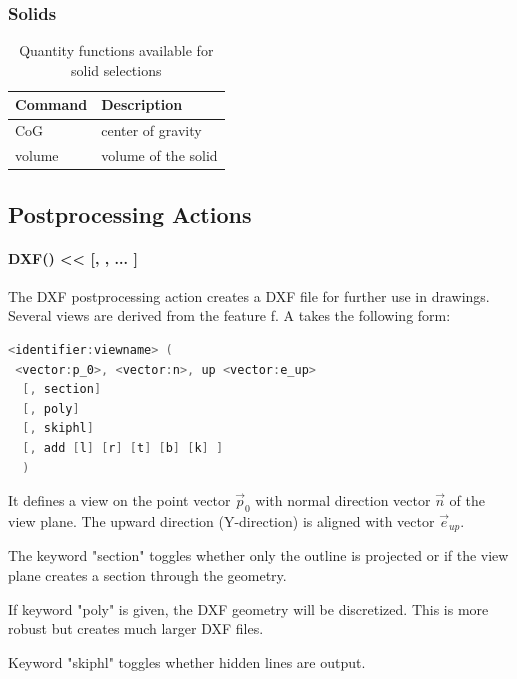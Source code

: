 \subsubsection{Solids}

\begin{table}[h!]
\centering
\begin{tabular}{ll}
Command & Description \\
\hline
    CoG                                     & center of gravity\\
    volume                                  & volume of the solid\\
\end{tabular}
\caption{Quantity functions available for solid selections}
\label{tab:iscad_feat_solids_qty}
\end{table}


\subsection{Postprocessing Actions}

\paragraph{DXF() \textless\textless { }  [, , ... ]}

The DXF postprocessing action creates a DXF file for further use in
drawings. Several views are derived from the feature f. A
 takes the following form:

\begin{lstlisting}[language=c++]
<identifier:viewname> (  
 <vector:p_0>, <vector:n>, up <vector:e_up>  
  [, section]  
  [, poly]  
  [, skiphl]  
  [, add [l] [r] [t] [b] [k] ]  
  )
\end{lstlisting}


It defines a view on the point vector $\vec p_0$ with normal direction vector $\vec n$
of the view plane. The upward direction (Y-direction) is aligned with
vector $\vec e_{up}$.

The keyword "section" toggles whether only the outline is projected or
if the view plane creates a section through the geometry.

If keyword "poly" is given, the DXF geometry will be discretized. This
is more robust but creates much larger DXF files.

Keyword "skiphl" toggles whether hidden lines are output.


